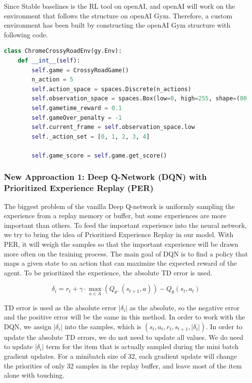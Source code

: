 \documentclass{article}
\begin{document}
Since Stable baselines is the RL tool on openAI, and openAI will work on the environment that follows the structure on openAI Gym. Therefore, a custom environment has been built by constructing the openAI Gym structure with following code. 

\begin{lstlisting}[language = Python]
class ChromeCrossyRoadEnv(gy.Env):
    def __int__(self):
        self.game = CrossyRoadGame()
        n_action = 5
        self.action_space = spaces.Discrete(n_actions)
        self.observation_space = spaces.Box(low=0, high=255, shape=(80, 80), dtype=np.uint8)
        self.gametime_reward = 0.1
        self.gameOver_penalty = -1
        self.current_frame = self.observation_space.low
        self._action_set = [0, 1, 2, 3, 4]

        self.game_score = self.game.get_score()
\end{lstlisting}

\subsubsection{New Approaction 1: Deep Q-Network (DQN) with Prioritized Experience Replay (PER)}
The biggest problem of the vanilla Deep Q-network is uniformly sampling the experience from a replay memory or buffer, but some experiences are more important than others. To feed the important experience into the neural network, we try to bring the idea of Prioritized Experience Replay in our model. With PER, it will weigh the samples so that the important experience will be drawn more often on the training process.  The main goal of DQN is to find a policy that maps a given state to an action that can maximize the expected reward of the agent. To be prioritized the experience, the absolute TD error is used.

$$\delta_i = r_t + \gamma \cdot \max_{a \in A} (Q_{\theta^-}(s_{t + 1}, a)) - Q_{\theta}(s_t, a_t)$$

TD error is used as the absolute error $|\delta_i|$ as the absolute, so the negative error and the positive error will be the same in this method. In order to work with the DQN, we assign $|\delta_i|$ into the samples, which is $(s_t,a_t,r_t,s_{t+1},|\delta_i|)$. In order to update the absolute TD errors, we do not need to update all values. We do need to update $|\delta_i|$ term for the item that is actually sampled during the mini batch gradient updates. For a minibatch size of 32, each gradient update will change the priorities of only 32 samples in the replay buffer, and leave most of the item alone with touching. \par 
\end{document}
